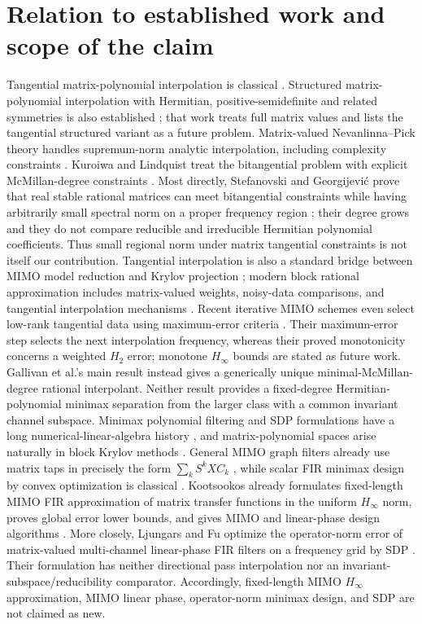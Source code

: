 \documentclass[11pt]{article}
\theoremstyle{remark}
\begin{document}
\section{Relation to established work and scope of the claim}

Tangential matrix-polynomial interpolation is classical
\cite{BallKang1990,Fuhrmann2010}.  Structured matrix-polynomial interpolation
with Hermitian, positive-semidefinite and related symmetries is also established
\cite{AlpayLewkowicz2014}; that work treats full matrix values and lists the
tangential structured variant as a future problem.  Matrix-valued
Nevanlinna--Pick theory handles
supremum-norm analytic interpolation, including complexity constraints
\cite{BlomqvistEtAl2003,BallBolotnikov2016}.  Kuroiwa and Lindquist treat the
bitangential problem with explicit McMillan-degree constraints
\cite{KuroiwaLindquist2006}.  Most directly,
Stefanovski and Georgijevi\'c prove that real stable rational matrices can meet
bitangential constraints while having arbitrarily small spectral norm on a
proper frequency region \cite{StefanovskiGeorgijevic2016}; their degree grows
and they do not compare reducible and irreducible Hermitian polynomial
coefficients.  Thus small regional norm under matrix tangential constraints is
not itself our contribution.  Tangential interpolation is also a standard
bridge between MIMO model reduction and Krylov projection
\cite{GallivanEtAl2004}; modern block rational approximation includes
matrix-valued weights, noisy-data comparisons, and tangential interpolation
mechanisms \cite{GoseaGuettel2021}.  Recent iterative MIMO schemes even select
low-rank tangential data using maximum-error criteria \cite{JonasBamieh2026}.
Their maximum-error step selects the next interpolation frequency, whereas
their proved monotonicity concerns a weighted $H_2$ error; monotone $H_\infty$
bounds are stated as future work.  Gallivan et al.'s main result instead gives
a generically unique minimal-McMillan-degree rational interpolant.  Neither
result provides a fixed-degree Hermitian-polynomial minimax separation from the
larger class with a common invariant channel subspace.  Minimax polynomial filtering and SDP
formulations have a long numerical-linear-algebra history
\cite{TohTrefethen1998}, and matrix-polynomial spaces arise naturally in block
Krylov methods \cite{RinelliVandebril2026}.  General MIMO graph filters already
use matrix taps in precisely the form $\sum_k S^kXC_k$
\cite{GamaEtAl2018}, while scalar FIR minimax design by convex optimization is
classical \cite{WuBoydVandenberghe1998}.  Kootsookos already formulates
fixed-length MIMO FIR approximation of matrix transfer functions in the
uniform $H_\infty$ norm, proves global error lower bounds, and gives MIMO and
linear-phase design algorithms \cite{Kootsookos1991}.  More closely, Ljungars
and Fu optimize
the operator-norm error of matrix-valued multi-channel linear-phase FIR filters
on a frequency grid by SDP \cite{LjungarsFu1998}.  Their formulation has neither
directional pass interpolation nor an invariant-subspace/reducibility
comparator.  Accordingly, fixed-length MIMO $H_\infty$ approximation, MIMO
linear phase, operator-norm minimax design, and SDP are not claimed as new.
\end{document}
